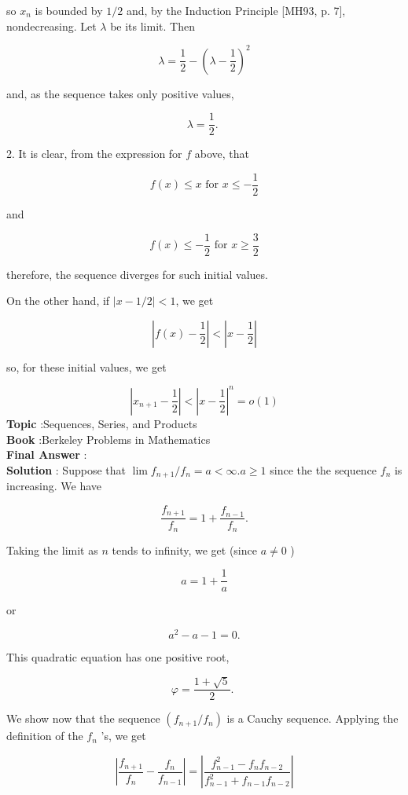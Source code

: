 \documentclass[10pt]{article}
\begin{document}
so $x_{n}$ is bounded by $1 / 2$ and, by the Induction Principle [MH93, p. 7], nondecreasing. Let $\lambda$ be its limit. Then

$$
\lambda=\frac{1}{2}-\left(\lambda-\frac{1}{2}\right)^{2}
$$

and, as the sequence takes only positive values,

$$
\lambda=\frac{1}{2} \text {. }
$$

2. It is clear, from the expression for $f$ above, that

$$
f(x) \leqslant x \text { for } x \leqslant-\frac{1}{2}
$$

and

$$
f(x) \leqslant-\frac{1}{2} \text { for } x \geqslant \frac{3}{2}
$$

therefore, the sequence diverges for such initial values.

On the other hand, if $|x-1 / 2|<1$, we get

$$
\left|f(x)-\frac{1}{2}\right|<\left|x-\frac{1}{2}\right|
$$

so, for these initial values, we get

$$
\left|x_{n+1}-\frac{1}{2}\right|<\left|x-\frac{1}{2}\right|^{n}=o(1)
$$
\textbf{Topic} :Sequences, Series, and Products \\
\textbf{Book} :Berkeley Problems in Mathematics\\
\textbf{Final Answer} :\\


\textbf{Solution} : Suppose that $\lim f_{n+1} / f_{n}=a<\infty . a \geqslant 1$ since the the sequence $f_{n}$ is increasing. We have

$$
\frac{f_{n+1}}{f_{n}}=1+\frac{f_{n-1}}{f_{n}} .
$$

Taking the limit as $n$ tends to infinity, we get (since $a \neq 0$ )

$$
a=1+\frac{1}{a}
$$

or

$$
a^{2}-a-1=0 .
$$

This quadratic equation has one positive root,

$$
\varphi=\frac{1+\sqrt{5}}{2} \text {. }
$$

We show now that the sequence $\left(f_{n+1} / f_{n}\right)$ is a Cauchy sequence. Applying the definition of the $f_{n}$ 's, we get

$$
\left|\frac{f_{n+1}}{f_{n}}-\frac{f_{n}}{f_{n-1}}\right|=\left|\frac{f_{n-1}^{2}-f_{n} f_{n-2}}{f_{n-1}^{2}+f_{n-1} f_{n-2}}\right|
$$
\end{document}
